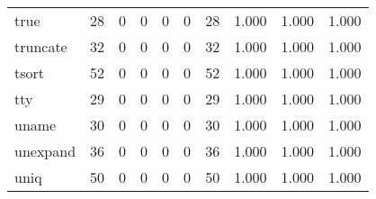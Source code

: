 \begin{longtable}{lp{2.0cm}p{2.0cm}p{2.0cm}p{2.0cm}p{2.0cm}p{2.0cm}p{2.0cm}p{2.0cm}p{2.0cm}}
true      &                     28 &                                             0 &                                            0 &                                           0 &                                            0 &                                         28 &                                1.000 &                                  1.000 &                                1.000 \\
truncate  &                     32 &                                             0 &                                            0 &                                           0 &                                            0 &                                         32 &                                1.000 &                                  1.000 &                                1.000 \\
tsort     &                     52 &                                             0 &                                            0 &                                           0 &                                            0 &                                         52 &                                1.000 &                                  1.000 &                                1.000 \\
tty       &                     29 &                                             0 &                                            0 &                                           0 &                                            0 &                                         29 &                                1.000 &                                  1.000 &                                1.000 \\
uname     &                     30 &                                             0 &                                            0 &                                           0 &                                            0 &                                         30 &                                1.000 &                                  1.000 &                                1.000 \\
unexpand  &                     36 &                                             0 &                                            0 &                                           0 &                                            0 &                                         36 &                                1.000 &                                  1.000 &                                1.000 \\
uniq      &                     50 &                                             0 &                                            0 &                                           0 &                                            0 &                                         50 &                                1.000 &                                  1.000 &                                1.000 \\

\end{longtable}
